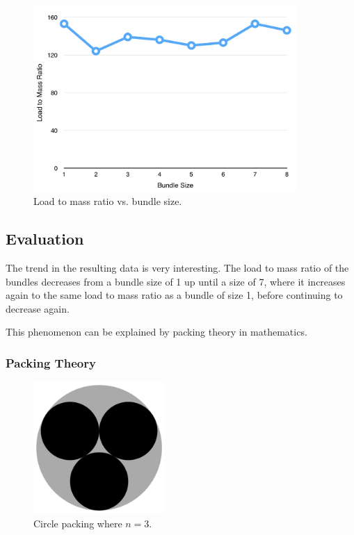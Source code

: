 \documentclass[a4paper,11pt]{article}
\begin{document}
\begin{figure}
\begin{center}
\includegraphics[width=10cm]{figures/bundles.png}
\end{center}
\caption{Load to mass ratio vs. bundle size.}
\label{bundles:graph}
\end{figure}



\subsection{Evaluation}

The trend in the resulting data is very interesting. The load to mass ratio of
the bundles decreases from a bundle size of 1 up until a size of 7, where it
increases again to the same load to mass ratio as a bundle of size 1, before
continuing to decrease again.

This phenomenon can be explained by packing theory in mathematics.


\subsubsection{Packing Theory}

\begin{figure}
\begin{center}
\includegraphics[width=5cm]{figures/bundle-3.png}
\end{center}
\caption{Circle packing where $n = 3$.}
\label{bundles:bundle-3}
\end{figure}
\end{document}
